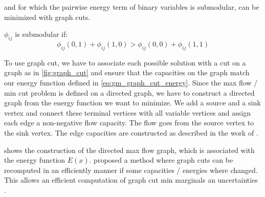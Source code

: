 and for which the pairwise energy term of binary variables is submodular, can be minimized with
graph cuts. 

$\phi_{ij}$ is submodular if:
\begin{equation} \label{eq:gm_submodular_criterion}
    \phi_{ij}(0,1) + \phi_{ij}(1,0) >  \phi_{ij}(0,0) + \phi_{ij}(1,1)
\end{equation}

To use graph cut, we have to associate each possible solution with a cut on a graph as in
\cref{fig:graph_cut} and ensure that the capacities on the graph match our energy function 
defined in \cref{eq:gm_graph_cut_energy}.
Since the max flow / min cut problem is defined on a directed graph, we have to construct
a directed graph from the energy function we want to minimize. We add a source and a
sink vertex and connect these terminal vertices with all variable vertices and assign
each edge a non-negative flow capacity. The flow goes from the source vertex to the
sink vertex. The edge capacities are constructed as described in the work of
\citet{kolmogorov_2004_pami}.

 shows the
construction of  the directed max flow  graph, which is associated with the energy function $E(x)$.
\citet{kohli_2007_pami} proposed a method where graph cuts can be recomputed in an efficiently manner
if some capacities / energies where changed. This allows an efficient computation of 
graph cut min marginals an uncertainties \citep{kohli_2006_eccv,tarlow_2012_cvpr}.



